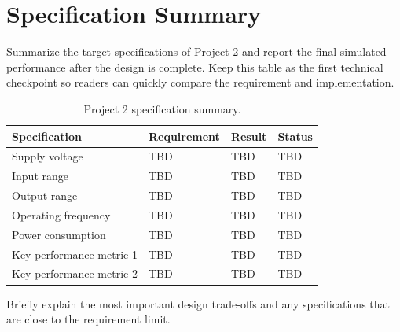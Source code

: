 \section{Specification Summary}
\label{sec:spec_summary}

Summarize the target specifications of Project 2 and report the final simulated
performance after the design is complete. Keep this table as the first technical
checkpoint so readers can quickly compare the requirement and implementation.

\begin{table}[H]
    \centering
    \caption{Project 2 specification summary.}
    \label{tab:spec_summary}
    \renewcommand{\arraystretch}{1.25}
    \begin{tabularx}{0.95\textwidth}{
        >{\raggedright\arraybackslash}X
        >{\centering\arraybackslash}p{3.2cm}
        >{\centering\arraybackslash}p{3.2cm}
        >{\centering\arraybackslash}p{2.4cm}
    }
        \toprule
        \textbf{Specification} & \textbf{Requirement} & \textbf{Result} & \textbf{Status} \\
        \midrule
        Supply voltage & TBD & TBD & TBD \\
        Input range & TBD & TBD & TBD \\
        Output range & TBD & TBD & TBD \\
        Operating frequency & TBD & TBD & TBD \\
        Power consumption & TBD & TBD & TBD \\
        Key performance metric 1 & TBD & TBD & TBD \\
        Key performance metric 2 & TBD & TBD & TBD \\
        \bottomrule
    \end{tabularx}
\end{table}

Briefly explain the most important design trade-offs and any specifications that
are close to the requirement limit.
